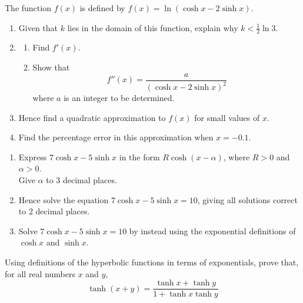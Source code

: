\documentclass[leqno]{article}
\begin{document}
\begin{enumerate}[
  label=\textbf{\arabic*.},
  leftmargin=*,
  topsep=0pt,
  partopsep=0pt,
  parsep=0pt
]
The function $f(x)$ is defined by $f(x)=\ln(\cosh x-2\sinh x)$. \\
\begin{enumerate}[label=\textbf{(\alph*)}]
  \item Given that $k$ lies in the domain of this function, explain why $k<\frac{1}{2}\ln 3$.  \\
  \item
  \begin{enumerate}[label=(\roman*)]
    \item Find $f'(x)$. 
    \item Show that
    \[
    f''(x)=\frac{a}{(\cosh x-2\sinh x)^2}
    \]
    where $a$ is an integer to be determined.  \\
  \end{enumerate}
  \item Hence find a quadratic approximation to $f(x)$ for small values of $x$.  \\
  \item Find the percentage error in this approximation when $x=-0.1$.  \\
\end{enumerate}

\newpage

\questionitem

\begin{enumerate}[label=\textbf{(\alph*)}]
  \item Express $7\cosh x - 5\sinh x$ in the form $R\cosh(x - \alpha)$, where $R > 0$ and $\alpha > 0$.\\ Give $\alpha$ to $3$ decimal places.  \\
  \item Hence solve the equation $7\cosh x - 5\sinh x = 10$, giving all solutions correct to $2$ decimal places.  \\
  \item Solve $7\cosh x - 5\sinh x = 10$ by instead using the exponential definitions of $\cosh x$ and $\sinh x$.  \\
\end{enumerate}

\newpage

\questionitem

Using definitions of the hyperbolic functions in terms of exponentials, prove that, for all real numbers $x$ and $y$,
\[
\tanh(x+y)=\frac{\tanh x+\tanh y}{1+\tanh x\tanh y}
\]


\end{enumerate}
\end{document}
